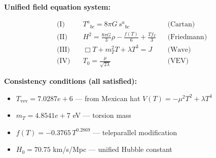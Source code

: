 
\textbf{Unified field equation system:}

\begin{align}
  \text{(I)} \quad & T^a{}_{bc} = 8\pi G \, s^a{}_{bc} && \text{(Cartan)} \\
  \text{(II)} \quad & H^2 = \frac{8\pi G}{3}\rho - \frac{f(T)}{6} + \frac{Tf_T}{3} && \text{(Friedmann)} \\
  \text{(III)} \quad & \Box T + m_T^2 T + \lambda T^3 = J && \text{(Wave)} \\
  \text{(IV)} \quad & T_0 = \frac{\mu}{\sqrt{2\lambda}} && \text{(VEV)}
\end{align}

\textbf{Consistency conditions (all satisfied):}
\begin{itemize}
  \item $T_{\text{vev}} = 7.0287e+6$ — from Mexican hat $V(T) = -\mu^2 T^2 + \lambda T^4$
  \item $m_T = 4.8541e+7$ eV — torsion mass
  \item $f(T) = -0.3765 \, T^{0.2869}$ — teleparallel modification
  \item $H_0 = 70.75$ km/s/Mpc — unified Hubble constant
\end{itemize}